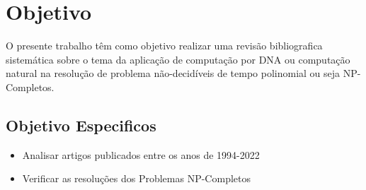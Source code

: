 \section*{Objetivo}
O presente trabalho têm como objetivo realizar uma revisão bibliografica sistemática
sobre o tema da aplicação de computação por DNA ou computação natural na resolução
de problema não-decidíveis de tempo polinomial ou seja NP-Completos.

\subsection*{Objetivo Especificos}
\begin{itemize}
    \item{Analisar artigos publicados entre os anos de 1994-2022}
    \item{Verificar as resoluções dos Problemas NP-Completos}
\end{itemize}